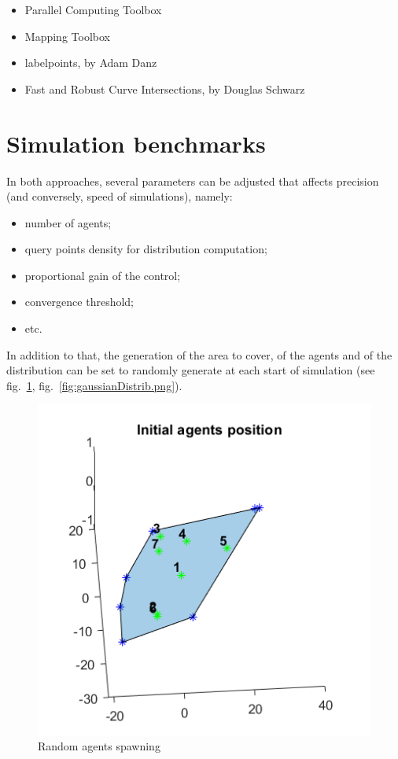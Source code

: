 \documentclass[a4paper,11pt,oneside]{book}
\begin{document}
	\begin{itemize}
		\item Parallel Computing Toolbox
		\item Mapping Toolbox
		\item labelpoints, by Adam Danz
		\item Fast and Robust Curve Intersections, by Douglas Schwarz
	\end{itemize}
	
	\section{Simulation benchmarks}
	
	In both approaches, several parameters can be adjusted that affects precision (and conversely, speed of simulations), namely:
	
	\begin{itemize}
		\item number of agents;
		\item query points density for distribution computation;
		\item proportional gain of the control;
		\item convergence threshold;
		\item etc.
	\end{itemize}
	
	In addition to that, the generation of the area to cover, of the agents and of the distribution can be set to randomly generate at each start of simulation (see fig.~\ref{fig:randomAgents.png}, fig.~\ref{fig:gaussianDistrib.png}).
	
	\begin{figure}	
		\centering	
		\includegraphics[scale=0.7]{figs/randomAgents.png}
		\caption{Random agents spawning}\label{fig:randomAgents.png}	
	\end{figure}
	
\end{document}
